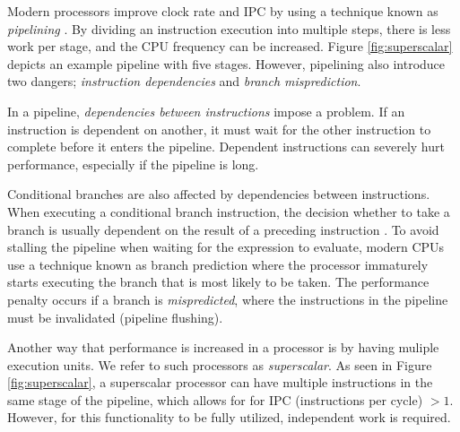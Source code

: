 Modern processors improve clock rate and IPC by using a technique known as \textit{pipelining} \cite{Boncz2005-wj}. By dividing an instruction execution into multiple steps, there is less work per stage, and the CPU frequency can be increased. Figure \ref{fig:superscalar} depicts an example pipeline with five stages. However, pipelining also introduce two dangers; \textit{instruction dependencies} and \textit{branch misprediction}.

In a pipeline, \textit{dependencies between instructions} impose a problem. If an instruction is dependent on another, it must wait for the other instruction to complete before it enters the pipeline. Dependent instructions can severely hurt performance, especially if the pipeline is long.

Conditional branches are also affected by dependencies between instructions. When executing a conditional branch instruction, the decision whether to take a branch is usually dependent on the result of a preceding instruction \cite{Boncz2005-wj}. To avoid stalling the pipeline when waiting for the expression to evaluate, modern CPUs use a technique known as branch prediction where the processor immaturely starts executing the branch that is most likely to be taken. The performance penalty occurs if a branch is \textit{mispredicted}, where the instructions in the pipeline must be invalidated (pipeline flushing).

Another way that performance is increased in a processor is by having muliple execution units. We refer to such processors as \textit{superscalar}. As seen in Figure \ref{fig:superscalar}, a superscalar processor can have multiple instructions in the same stage of the pipeline, which allows for for IPC (instructions per cycle) $> 1$. However, for this functionality to be fully utilized, independent work is required.

